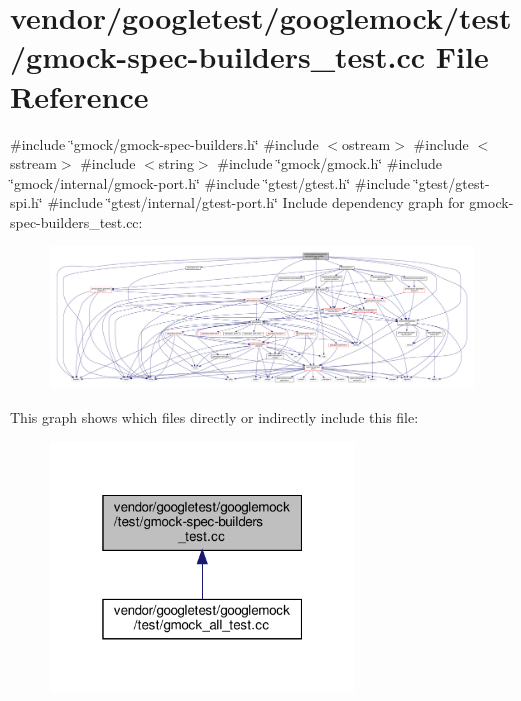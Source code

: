 \hypertarget{gmock-spec-builders__test_8cc}{}\section{vendor/googletest/googlemock/test/gmock-\/spec-\/builders\+\_\+test.cc File Reference}
\label{gmock-spec-builders__test_8cc}
{\ttfamily \#include \char`\"{}gmock/gmock-\/spec-\/builders.\+h\char`\"{}}\newline
{\ttfamily \#include $<$ostream$>$}\newline
{\ttfamily \#include $<$sstream$>$}\newline
{\ttfamily \#include $<$string$>$}\newline
{\ttfamily \#include \char`\"{}gmock/gmock.\+h\char`\"{}}\newline
{\ttfamily \#include \char`\"{}gmock/internal/gmock-\/port.\+h\char`\"{}}\newline
{\ttfamily \#include \char`\"{}gtest/gtest.\+h\char`\"{}}\newline
{\ttfamily \#include \char`\"{}gtest/gtest-\/spi.\+h\char`\"{}}\newline
{\ttfamily \#include \char`\"{}gtest/internal/gtest-\/port.\+h\char`\"{}}\newline
Include dependency graph for gmock-\/spec-\/builders\+\_\+test.cc\+:
\nopagebreak
\begin{figure}[H]
\begin{center}
\leavevmode
\includegraphics[width=350pt]{gmock-spec-builders__test_8cc__incl}
\end{center}
\end{figure}
This graph shows which files directly or indirectly include this file\+:
\nopagebreak
\begin{figure}[H]
\begin{center}
\leavevmode
\includegraphics[width=229pt]{gmock-spec-builders__test_8cc__dep__incl}
\end{center}
\end{figure}

